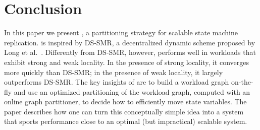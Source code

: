 \section{Conclusion}
\label{sec:conclusion}

In this paper we present \dynastar, a partitioning strategy for scalable state machine replication.
\dynastar is inspired by DS-SMR, a decentralized dynamic scheme proposed by Long et al.~\cite{hoang2016}.
Differently from DS-SMR, however, \dynastar performs well in workloads that exhibit strong and weak locality.
In the presence of strong locality, it converges more quickly than DS-SMR; in the presence of weak locality, it largely outperforms DS-SMR.
The key insights of \dynastar are to build a workload graph on-the-fly and use an optimized partitioning of the workload graph, computed with an online graph partitioner, to decide how to efficiently move state variables.
The paper describes how one can turn this conceptually simple idea into a system that sports performance close to an optimal (but impractical) scalable system.
